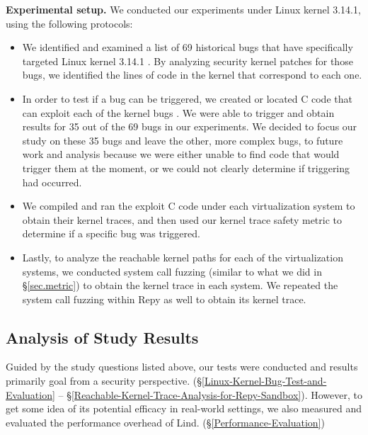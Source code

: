 \textbf{Experimental setup.}
We conducted our experiments under Linux kernel 3.14.1, using the following
protocols:

\begin{itemize}
\item We identified and examined a list of  69 historical bugs that have
specifically
targeted Linux kernel 3.14.1 \cite{CVE-Datasource}. By analyzing
security kernel patches for those bugs,
we identified the lines of code in the kernel that correspond to each
one.

\item In order to test if a bug can be triggered, we created or located C
code that can exploit each of the kernel bugs \cite{Exploit-Database}.
We were able to trigger and obtain results for
35 out of the 69 bugs in our experiments. We decided to focus our study on these
35 bugs and leave the other, more complex bugs, to future work and analysis
because we were either unable to find code that would trigger them at the moment,
or we could not clearly determine if triggering had occurred. 

\item We compiled and ran the exploit C code under each virtualization
system to
obtain their kernel traces, and then used our kernel trace safety metric to
determine
if a specific bug was triggered.

\item Lastly, to analyze the reachable kernel paths for each of the
virtualization systems,
we conducted system call fuzzing (similar to what we did in \S{\ref{sec.metric}}) to obtain
the kernel trace in each system.
We repeated the system call fuzzing within Repy as well to obtain its
kernel trace.
\end{itemize}

\subsection{Analysis of Study Results}

Guided by the study questions listed above, our tests were conducted and results
primarily goal from a security perspective.
(\S{\ref{Linux-Kernel-Bug-Test-and-Evaluation}} --
\S{\ref{Reachable-Kernel-Trace-Analysis-for-Repy-Sandbox}}).
However, to get some idea of its potential efficacy
in real-world settings, we also measured and evaluated the performance
overhead of Lind.
(\S{\ref{Performance-Evaluation}})

